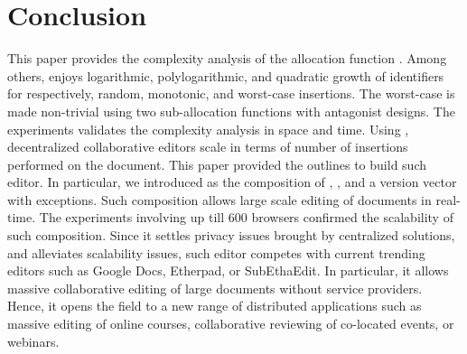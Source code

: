 
\section{Conclusion}
\label{sec:conclusion}

This paper provides the complexity analysis of the allocation function
\LSEQ. Among others, \LSEQ enjoys logarithmic, polylogarithmic, and quadratic
growth of identifiers for respectively, random, monotonic, and worst-case
insertions. The worst-case is made non-trivial using two sub-allocation
functions with antagonist designs. The experiments validates the complexity
analysis in space and time.  Using \LSEQ, decentralized collaborative editors
scale in terms of number of insertions performed on the document. This paper
provided the outlines to build such editor. In particular, we introduced \CRATE
as the composition of \LSEQ, \SPRAY, and a version vector with exceptions. Such
composition allows large scale editing of documents in real-time. The
experiments involving up till 600 browsers confirmed the scalability of such
composition. Since it settles privacy issues brought by centralized solutions,
and alleviates scalability issues, such editor competes with current trending
editors such as Google Docs, Etherpad, or SubEthaEdit. In particular, it allows
massive collaborative editing of large documents without service
providers. Hence, it opens the field to a new range of distributed applications
such as massive editing of online courses, collaborative reviewing of co-located
events, or webinars.



